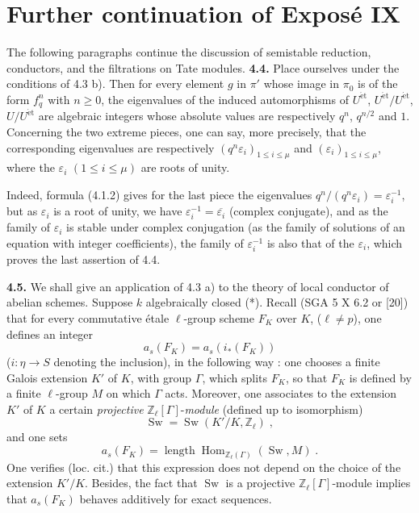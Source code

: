 \documentclass[11pt]{article}
\theoremstyle{plain}
\theoremstyle{definition}
\theoremstyle{remark}
\newcommand{\ZZ}{\mathbb Z}
\DeclareMathOperator{\Hom}{Hom}
\newcommand{\et}{\mathrm{\acute{e}t}}
\newcommand{\longueur}{\operatorname{length}}
\begin{document}
\clearpage
\section*{Further continuation of Exposé IX}

The following paragraphs continue the discussion of semistable reduction,
conductors, and the filtrations on Tate modules.
\noindent\textbf{4.4.} Place ourselves under the conditions of 4.3 b).
Then for every element $g$ in $\pi'$ whose image in $\pi_0$ is of the
form $f_q^n$ with $n \geq 0$, the eigenvalues of the induced automorphisms
of $U^{\et}$, $U^{\et}/U^{\et}$, $U/U^{\et}$ are algebraic integers whose
absolute values are respectively $q^n$, $q^{n/2}$ and $1$. Concerning the
two extreme pieces, one can say, more precisely, that the corresponding
eigenvalues are respectively $(q^n \varepsilon_i)_{1 \leq i \leq \mu}$ and
$(\varepsilon_i)_{1 \leq i \leq \mu}$, where the $\varepsilon_i$
$(1 \leq i \leq \mu)$ are roots of unity.

Indeed, formula (4.1.2) gives for the last piece the eigenvalues
$q^n/(q^n \varepsilon_i) = \varepsilon_i^{-1}$, but as $\varepsilon_i$
is a root of unity, we have $\varepsilon_i^{-1} = \overline{\varepsilon_i}$
(complex conjugate), and as the family of $\varepsilon_i$ is stable under
complex conjugation (as the family of solutions of an equation with
integer coefficients), the family of $\varepsilon_i^{-1}$ is also that of
the $\varepsilon_i$, which proves the last assertion of 4.4.

\medskip

\noindent\textbf{4.5.} We shall give an application of 4.3 a) to the theory
of local conductor of abelian schemes. Suppose $k$ algebraically closed
(*). Recall (SGA 5 X 6.2 or [20]) that for every commutative \'etale
$\ell$-group scheme $F_K$ over $K$, ($\ell \neq p$), one defines an
integer
\begin{equation}
a_s(F_K) = a_s(i_*(F_K))
\end{equation}
($i \colon \eta \to S$ denoting the inclusion), in the following way : one
chooses a finite Galois extension $K'$ of $K$, with group $\Gamma$, which
splits $F_K$, so that $F_K$ is defined by a finite $\ell$-group $M$ on
which $\Gamma$ acts. Moreover, one associates to the extension $K'$ of
$K$ a certain \emph{projective} $\ZZ_{\ell}[\Gamma]$-\emph{module}
(defined up to isomorphism)
\begin{equation}
\operatorname{Sw} = \operatorname{Sw}(K'/K, \ZZ_{\ell}) \; ,
\end{equation}
and one sets
\begin{equation}
a_s(F_K) = \longueur \Hom_{\ZZ_{\ell}(\Gamma)}(\operatorname{Sw}, M) \; .
\end{equation}
One verifies (loc. cit.) that this expression does not depend on the
choice of the extension $K'/K$. Besides, the fact that
$\operatorname{Sw}$ is a projective $\ZZ_{\ell}[\Gamma]$-module implies
that $a_s(F_K)$ behaves additively for exact sequences.
\end{document}
